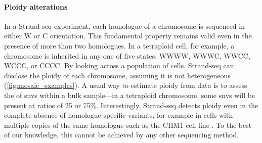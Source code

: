 

\paragraph{Ploidy alterations}
In a Strand-seq experiment, each homologue of a chromosome is sequenced in
either W or C orientation. This fundamental property remains valid even in the
presence of more than two homologues. In a tetraploid cell, for example, a
chromosome is inherited in any one of five states: WWWW, WWWC, WWCC, WCCC, or
CCCC. By looking across a population of cells, Strand-seq can disclose the
ploidy of each chromosome, assuming it is not heterogeneous
(\cref{fig:mosaic_examples}). A
usual way to estimate ploidy from \mps data is to assess the \baf of \acp{snv} within a bulk
sample---in a tetraploid chromosome, some \acp{snv} will be present at ratios of
25 or 75\%. Interestingly, Strand-seq detects ploidy even in the complete
absence of homologue-specific variants, for example in cells with multiple
copies of the same homologue such as the CHM1 cell line \citep{Steinberg2014}.
To the best of our knowledge, this cannot be achieved by any other sequencing method.

